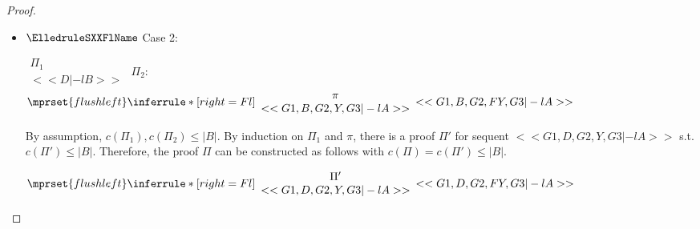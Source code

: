 \begin{proof}
\begin{enumerate}
\begin{itemize}
  \item $\ElledruleSXXFlName$ Case 2:
    \begin{center}
      \scriptsize
      \begin{math}
        \begin{array}{c}
          \Pi_1 \\
          {<<D |-l B>>}
        \end{array}
      \end{math}
      \qquad\qquad
      $\Pi_2$:
      \begin{math}
        $$\mprset{flushleft}
        \inferrule* [right={\tiny Fl}] {
          {
            \begin{array}{c}
              \pi \\
              {<<G1, B, G2, Y, G3 |-l A>>}
            \end{array}
          }
        }{<<G1, B, G2, F Y, G3 |-l A>>}
      \end{math}
    \end{center}
    By assumption, $c(\Pi_1),c(\Pi_2)\leq |B|$. By induction on $\Pi_1$ and $\pi$, there is a
    proof $\Pi'$ for sequent $<<G1, D, G2, Y, G3 |-l A>>$ s.t. $c(\Pi') \leq |B|$. Therefore,
    the proof $\Pi$ can be constructed as follows with $c(\Pi) = c(\Pi') \leq |B|$.
    \begin{center}
      \scriptsize
      \begin{math}
        $$\mprset{flushleft}
        \inferrule* [right={\tiny Fl}] {
          {
            \begin{array}{c}
              \Pi' \\
              {<<G1, D, G2, Y, G3 |-l A>>}
            \end{array}
          }
        }{<<G1, D, G2, F Y, G3 |-l A>>}
      \end{math}
    \end{center}


\end{itemize}
\end{enumerate}
\end{proof}
